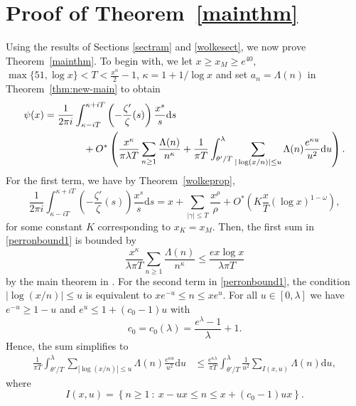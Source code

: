 \documentclass[reqno]{amsart}
\numberwithin{equation}{section}
\theoremstyle{remark}
\begin{document}
\section{Proof of Theorem~\ref{mainthm}}\label{mainsect}
Using the results of Sections \ref{sectram} and \ref{wolkesect}, we now prove Theorem~\ref{mainthm}. To begin with, we let $x\geq x_M\geq e^{40}$,  $\max\{51,\log x\}<T<\frac{x^{\alpha}}{2}-1$, $\kappa=1+1/\log x$ and set $a_n=\Lambda(n)$ in Theorem~\ref{thm:new-main} to obtain
\begin{align}\label{perronbound1}
        &\psi(x) = \frac{1}{2\pi i} \int_{\kappa-iT}^{\kappa+iT} \left(-\frac{\zeta'}{\zeta}(s)\right) \frac{x^s}{s} \mathrm{d}s \notag\\
        &\qquad\qquad\qquad +O^{*}\left(\frac{x^\kappa}{\pi\lambda T} \sum_{n\geq 1} \frac{\Lambda(n)}{n^\kappa}  +  \frac{1}{\pi T}\int_{\theta'/T}^{\lambda} \sum_{|\log(x/n)| \leq u} \Lambda(n) \frac{e^{\kappa u}}{u^2}\mathrm{d}u\right).
\end{align}
For the first term, we have by Theorem~\ref{wolkeprop},
\begin{equation}\label{newwolkebound}
    \frac{1}{2\pi i}\int_{\kappa-iT}^{\kappa+iT}\left(-\frac{\zeta'}{\zeta}(s)\right)\frac{x^s}{s}\mathrm{d}s=x+\sum_{|\gamma|\leq T}\frac{x^{\rho}}{\rho}+O^*\left(K\frac{x}{T}(\log x)^{1-\omega}\right),
\end{equation}
for some constant $K$ corresponding to $x_K=x_M$. Then, the first sum in \eqref{perronbound1} is bounded by
\begin{equation}\label{firstsumbound}
    \frac{x^\kappa}{\lambda\pi T} \sum_{n\geq 1} \frac{\Lambda(n)}{n^\kappa}\leq\frac{ex\log x}{\lambda\pi T}
\end{equation}
by the main theorem in \cite{Delange_87}. For the second term in \eqref{perronbound1}, the condition $|\log(x/n)|\leq u$ is equivalent to $xe^{-u}\leq n\leq xe^u$. For all $u\in[0,\lambda]$ we have $e^{-u}\geq 1-u$ and $e^u\leq 1+(c_0-1)u$ with $$c_0 = c_0(\lambda) = \frac{e^\lambda-1}{\lambda}+1.$$ Hence, the sum simplifies to
\begin{align}\label{perronbound2}
    \frac{1}{\pi T}\int_{\theta'/T}^{\lambda} \sum_{|\log(x/n)| \leq u} \Lambda(n) \frac{e^{\kappa u}}{u^2}\mathrm{d}u&\leq \frac{e^{\kappa\lambda}}{\pi T}\int^{\lambda}_{\theta'/T}\frac{1}{u^2}\sum_{I(x,u)}\Lambda(n)\mathrm{d}u,
\end{align}
where
\begin{equation*}
    I(x,u)=\left\{n\geq 1\::\:x-ux\leq n\leq x + (c_0-1)ux \right\}.
\end{equation*}
\end{document}
